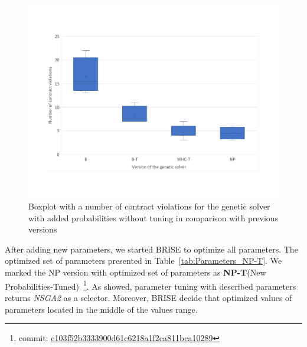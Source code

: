 \begin{figure}
	\centering
	\includegraphics[width=\textwidth]{images/BoxPlotSolverNewParameters.pdf}
	\caption[Boxplot with a number of contract violations for the genetic solver with added probabilities without tuning in comparison with previous versions]{Boxplot with a number of contract violations for the genetic solver with added probabilities without tuning in comparison with previous versions}
	\label{fig:boxplotsolverNewParameters}
\end{figure}

After adding new parameters, we started BRISE to optimize all parameters. The optimized set of parameters presented in Table~\ref{tab:Parameters_NP-T}. We marked the NP version with optimized set of parameters as \textbf{NP-T}(New Probabilities-Tuned)~\footnote{commit: \href{https://git-st.inf.tu-dresden.de/mquat/mquat2/commit/e103f52b3333900d61c6218a1f2ca811bca10289}{e103f52b3333900d61c6218a1f2ca811bca10289}}. As showed, parameter tuning with described parameters returns \textit{NSGA2} as a selector. Moreover, BRISE decide that optimized values of parameters located in the middle of the values range.

